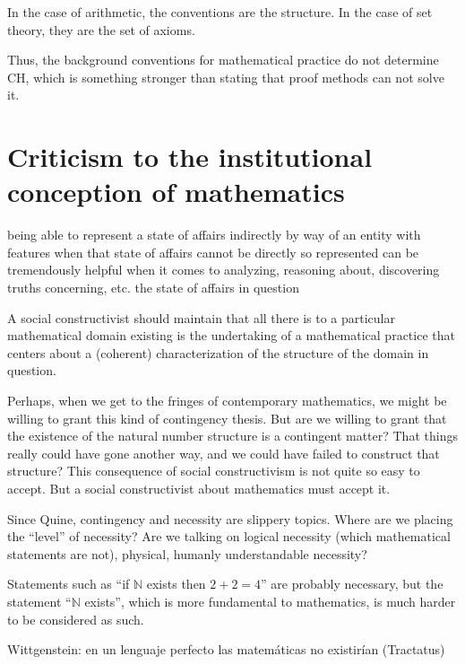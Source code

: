 \documentclass[11pt,a4paper]{article}
\begin{document}
In the case of arithmetic, the conventions are the structure. In the case of set theory, they are the set of axioms.

Thus, the background conventions for mathematical practice do not determine $\mathrm{CH}$, which is something stronger than stating that proof methods can not solve it.

\section{Criticism to the institutional conception of mathematics}

being able to represent a state of affairs indirectly by way of an entity with features when that state of affairs cannot be directly so represented can be tremendously helpful when it comes to analyzing, reasoning about, discovering truths concerning, etc. the state of affairs in question \textcite[12]{Cole2013}

A social constructivist should maintain that all there is to a particular mathematical domain existing is the undertaking of a mathematical practice that centers about a (coherent) characterization of the structure of the domain in question. \textcite[117]{Cole2008MathematicalDomains}

Perhaps, when we get to the fringes of contemporary mathematics, we might be willing to grant this kind of contingency thesis. But are we willing to grant that the existence of the natural number structure is a contingent matter? That things really could have gone another way, and we could have failed to construct that structure? This consequence of social constructivism is not quite so easy to accept. But a social constructivist about mathematics must accept it. \textcite[323]{Dieterle2010}

Since Quine, contingency and necessity are slippery topics. Where are we placing the ``level'' of necessity? Are we talking on logical necessity (which mathematical statements are not), physical, humanly understandable necessity? 

Statements such as ``if $\mathbb{N}$ exists then $2+2=4$'' are probably necessary, but the statement ``$\mathbb{N}$ exists'', which is more fundamental to mathematics, is much harder to be considered as such. 

Wittgenstein: en un lenguaje perfecto las matemáticas no existirían (Tractatus) 
\end{document}
